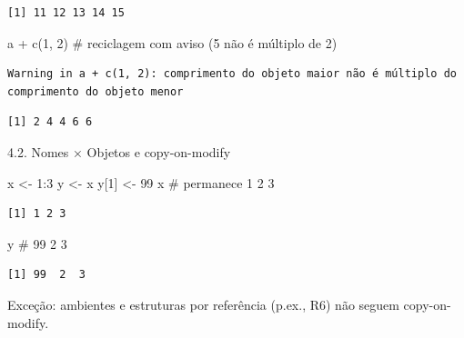 \documentclass[
  letterpaper,
  DIV=11,
  numbers=noendperiod]{scrreprt}
\newenvironment{Shaded}{\begin{snugshade}}{\end{snugshade}}
\newcommand{\CommentTok}[1]{\textcolor[rgb]{0.37,0.37,0.37}{#1}}
\newcommand{\DecValTok}[1]{\textcolor[rgb]{0.68,0.00,0.00}{#1}}
\newcommand{\FunctionTok}[1]{\textcolor[rgb]{0.28,0.35,0.67}{#1}}
\newcommand{\NormalTok}[1]{\textcolor[rgb]{0.00,0.23,0.31}{#1}}
\newcommand{\OtherTok}[1]{\textcolor[rgb]{0.00,0.23,0.31}{#1}}
\newcommand{\SpecialCharTok}[1]{\textcolor[rgb]{0.37,0.37,0.37}{#1}}
\begin{document}
\begin{verbatim}
[1] 11 12 13 14 15
\end{verbatim}

\begin{Shaded}
\begin{Highlighting}[]
\NormalTok{a }\SpecialCharTok{+} \FunctionTok{c}\NormalTok{(}\DecValTok{1}\NormalTok{, }\DecValTok{2}\NormalTok{) }\CommentTok{\# reciclagem com aviso (5 não é múltiplo de 2)}
\end{Highlighting}
\end{Shaded}

\begin{verbatim}
Warning in a + c(1, 2): comprimento do objeto maior não é múltiplo do
comprimento do objeto menor
\end{verbatim}

\begin{verbatim}
[1] 2 4 4 6 6
\end{verbatim}

4.2. Nomes × Objetos e copy-on-modify

\begin{Shaded}
\begin{Highlighting}[]
\NormalTok{x }\OtherTok{\textless{}{-}} \DecValTok{1}\SpecialCharTok{:}\DecValTok{3}
\NormalTok{y }\OtherTok{\textless{}{-}}\NormalTok{ x}
\NormalTok{y[}\DecValTok{1}\NormalTok{] }\OtherTok{\textless{}{-}} \DecValTok{99}
\NormalTok{x  }\CommentTok{\# permanece 1 2 3}
\end{Highlighting}
\end{Shaded}

\begin{verbatim}
[1] 1 2 3
\end{verbatim}

\begin{Shaded}
\begin{Highlighting}[]
\NormalTok{y  }\CommentTok{\# 99 2 3}
\end{Highlighting}
\end{Shaded}

\begin{verbatim}
[1] 99  2  3
\end{verbatim}

\begin{tcolorbox}[enhanced jigsaw, left=2mm, toprule=.15mm, opacityback=0, title=\textcolor{quarto-callout-warning-color}{\faExclamationTriangle}\hspace{0.5em}{Aviso}, leftrule=.75mm, breakable, colbacktitle=quarto-callout-warning-color!10!white, coltitle=black, rightrule=.15mm, bottomtitle=1mm, toptitle=1mm, colframe=quarto-callout-warning-color-frame, colback=white, opacitybacktitle=0.6, bottomrule=.15mm, arc=.35mm, titlerule=0mm]

Exceção: ambientes e estruturas por referência (p.ex., R6) não seguem
copy-on-modify.

\end{tcolorbox}
\end{document}
